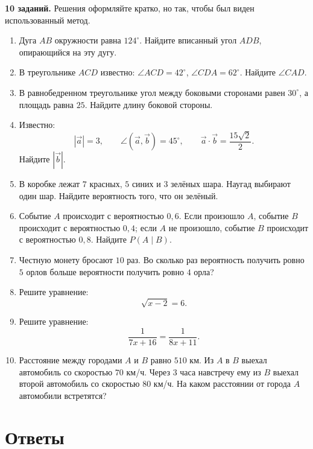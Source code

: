 \documentclass[a4paper,12pt]{article}
\begin{document}
\textbf{10 заданий.} Решения оформляйте кратко, но так, чтобы был виден использованный метод.

\begin{enumerate}
  \item Дуга \(AB\) окружности равна \(124^\circ\). Найдите вписанный угол \(ADB\), опирающийся на эту дугу.

  \item В треугольнике \(ACD\) известно:
  \(\angle ACD=42^\circ\), \(\angle CDA=62^\circ\).
  Найдите \(\angle CAD\).

  \item В равнобедренном треугольнике угол между боковыми сторонами равен \(30^\circ\), а площадь равна \(25\).
  Найдите длину боковой стороны.

  \item Известно:
  \[
  |\vec a|=3,\qquad
  \angle(\vec a,\vec b)=45^\circ,\qquad
  \vec a\cdot\vec b=\frac{15\sqrt2}{2}.
  \]
  Найдите \(|\vec b|\).

  \item В коробке лежат \(7\) красных, \(5\) синих и \(3\) зелёных шара.
  Наугад выбирают один шар. Найдите вероятность того, что он зелёный.

  \item Событие \(A\) происходит с вероятностью \(0{,}6\).
  Если произошло \(A\), событие \(B\) происходит с вероятностью \(0{,}4\);
  если \(A\) не произошло, событие \(B\) происходит с вероятностью \(0{,}8\).
  Найдите \(P(A\mid B)\).

  \item Честную монету бросают \(10\) раз.
  Во сколько раз вероятность получить ровно \(5\) орлов больше вероятности получить ровно \(4\) орла?

  \item Решите уравнение:
  \[
  \sqrt{x-2}=6.
  \]

  \item Решите уравнение:
  \[
  \frac{1}{7x+16}=\frac{1}{8x+11}.
  \]

  \item Расстояние между городами \(A\) и \(B\) равно \(510\) км.
  Из \(A\) в \(B\) выехал автомобиль со скоростью \(70\) км/ч.
  Через \(3\) часа навстречу ему из \(B\) выехал второй автомобиль со скоростью \(80\) км/ч.
  На каком расстоянии от города \(A\) автомобили встретятся?
\end{enumerate}

\clearpage

\section*{\color{darkaccent}Ответы}
\end{document}

